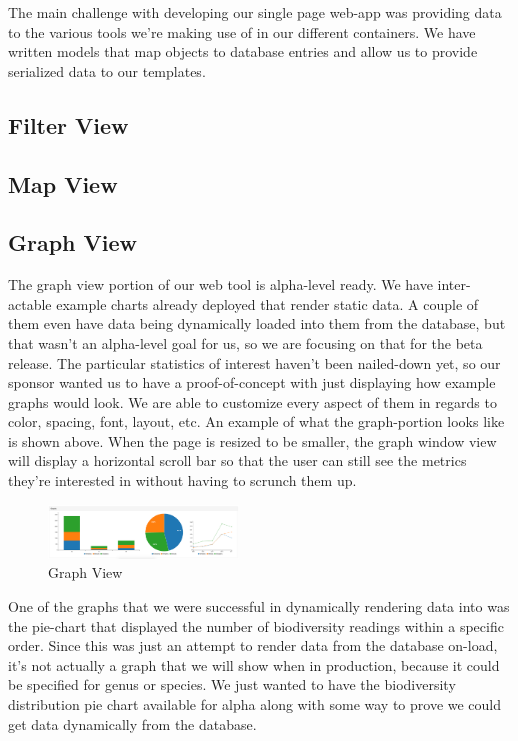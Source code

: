 \documentclass[10pt,peerreview,onecolumn,draftclsnofoot,technote]{IEEEtran}
\begin{document}
The main challenge with developing our single page web-app was providing data to the various tools we’re making use of in our different containers.
We have written models that map objects to database entries and allow us to provide serialized data to our templates.

\subsection{Filter View}

\subsection{Map View}

\subsection{Graph View} %
The graph view portion of our web tool is alpha-level ready.
We have inter-actable example charts already deployed that render  static data.
A couple of them even have data being dynamically loaded into them from the database, but that wasn’t an alpha-level goal for us, so we are focusing on that for the beta release.
The particular statistics of interest haven’t been nailed-down yet, so our sponsor wanted us to have a proof-of-concept with just displaying how example graphs would look.
We are able to customize every aspect of them in regards to color, spacing, font, layout, etc.
An example of what the graph-portion looks like is shown above.
When the page is resized to be smaller, the graph window view will display a horizontal scroll bar so that the user can still see the metrics they’re interested in without having to scrunch them up.

\begin{figure}[h]
\caption{Graph View}
\centering
\includegraphics[width=0.45\textwidth]{images/figure_6.jpg}
\end{figure}

One of the graphs that we were successful in dynamically rendering data into was the pie-chart that displayed the number of biodiversity readings within a specific order.
Since this was just an attempt to render data from the database on-load, it’s not actually a graph that we will show when in production, because it could be specified for genus or species.
We just wanted to have the biodiversity distribution pie chart available for alpha along with some way to prove we could get data dynamically from the database.
\end{document}
